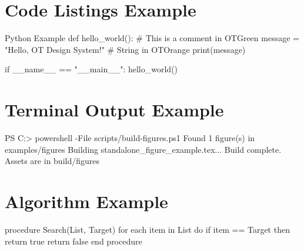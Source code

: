 \documentclass[a4paper]{article}
\begin{document}
\section{Code Listings Example}

\begin{otcode}[language=Python]{Python Example}
def hello_world():
    # This is a comment in OTGreen
    message = "Hello, OT Design System!" # String in OTOrange
    print(message)

if __name__ == "__main__":
    hello_world()
\end{otcode}

\section{Terminal Output Example}

\begin{otterminal}
PS C:\Users\Ot> powershell -File scripts/build-figures.ps1
Found 1 figure(s) in examples/figures
Building standalone_figure_example.tex...
Build complete. Assets are in build/figures
\end{otterminal}

\section{Algorithm Example}

\begin{otalgorithm}
procedure Search(List, Target)
  for each item in List do
    if item == Target then
      return true
  return false
end procedure
\end{otalgorithm}
\end{document}
